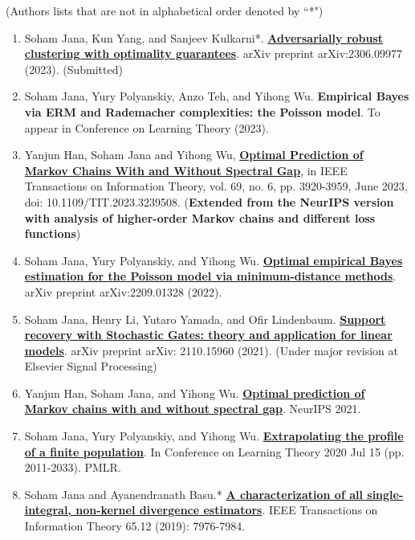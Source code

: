\documentclass[letterpaper,11pt,oneside]{article}
\theoremstyle{definition}
\begin{document}
	 (Authors lists that are not in alphabetical order denoted by ``*")
	
	\begin{enumerate}
		

		\item Soham Jana, Kun Yang, and Sanjeev Kulkarni*. \href{https://arxiv.org/abs/2306.09977}{\bf Adversarially robust clustering with optimality guarantees}. arXiv preprint arXiv:2306.09977 (2023). (Submitted)
		
		\item Soham Jana, Yury Polyanskiy, Anzo Teh, and Yihong Wu. {\bf Empirical Bayes via ERM and Rademacher complexities: the Poisson model}. To appear in Conference on Learning Theory (2023).
		
		
		\item Yanjun Han, Soham Jana and Yihong Wu, \href{https://ieeexplore.ieee.org/abstract/document/10028667}{\bf Optimal Prediction of Markov Chains With and Without Spectral Gap}, in IEEE Transactions on Information Theory, vol. 69, no. 6, pp. 3920-3959, June 2023, doi: 10.1109/TIT.2023.3239508. (\textbf{Extended from the NeurIPS version with analysis of higher-order Markov chains and different loss functions})
		
		\item Soham Jana, Yury Polyanskiy, and Yihong Wu. \href{https://arxiv.org/abs/2209.01328}{\bf Optimal empirical Bayes estimation for the Poisson model via minimum-distance methods}. arXiv preprint arXiv:2209.01328 (2022).
		
		\item Soham Jana, Henry Li, Yutaro Yamada, and Ofir Lindenbaum. {\bf \href{https://arxiv.org/abs/2110.15960}{\bf Support recovery with Stochastic Gates: theory and application for linear models}}. arXiv preprint arXiv: 2110.15960 (2021). (Under major revision at Elsevier Signal Processing)
		
		\item Yanjun Han, Soham Jana, and Yihong Wu. \href{https://arxiv.org/abs/2106.13947}{\bf Optimal prediction of Markov chains with and without spectral gap}. NeurIPS 2021.
		
		\item Soham Jana, Yury Polyanskiy, and Yihong Wu. \href{https://arxiv.org/abs/2005.10561}{\bf Extrapolating the profile of a finite population}. In Conference on Learning Theory 2020 Jul 15 (pp. 2011-2033). PMLR.
		
		\item Soham Jana and Ayanendranath Basu.* \href{https://janasoham.github.io/files/bregman_charac.pdf}{\bf A characterization of all single-integral, non-kernel divergence estimators}. IEEE Transactions on Information Theory 65.12 (2019): 7976-7984.
		
	\end{enumerate}
\end{document}
